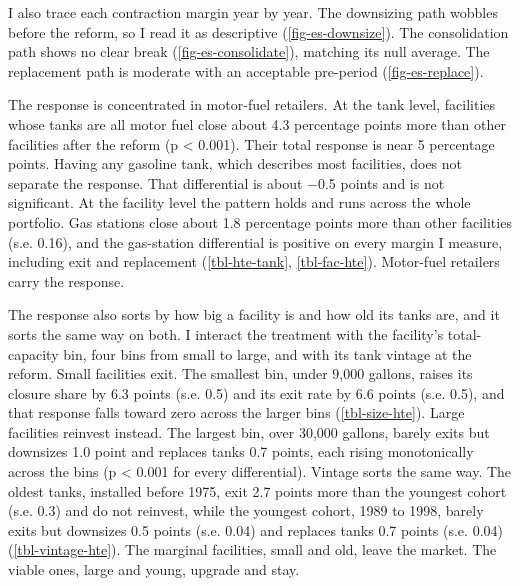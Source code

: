 \documentclass[
  12pt,
]{article}
\begin{document}
I also trace each contraction margin year by year. The downsizing path
wobbles before the reform, so I read it as descriptive
(\autoref{fig-es-downsize}). The consolidation path shows no clear break
(\autoref{fig-es-consolidate}), matching its null average. The
replacement path is moderate with an acceptable pre-period
(\autoref{fig-es-replace}).

The response is concentrated in motor-fuel retailers. At the tank level,
facilities whose tanks are all motor fuel close about 4.3 percentage
points more than other facilities after the reform (p \textless{}
0.001). Their total response is near 5 percentage points. Having any
gasoline tank, which describes most facilities, does not separate the
response. That differential is about −0.5 points and is not significant.
At the facility level the pattern holds and runs across the whole
portfolio. Gas stations close about 1.8 percentage points more than
other facilities (s.e. 0.16), and the gas-station differential is
positive on every margin I measure, including exit and replacement
(\autoref{tbl-hte-tank}, \autoref{tbl-fac-hte}). Motor-fuel retailers
carry the response.

The response also sorts by how big a facility is and how old its tanks
are, and it sorts the same way on both. I interact the treatment with
the facility's total-capacity bin, four bins from small to large, and
with its tank vintage at the reform. Small facilities exit. The smallest
bin, under 9,000 gallons, raises its closure share by 6.3 points (s.e.
0.5) and its exit rate by 6.6 points (s.e. 0.5), and that response falls
toward zero across the larger bins (\autoref{tbl-size-hte}). Large
facilities reinvest instead. The largest bin, over 30,000 gallons,
barely exits but downsizes 1.0 point and replaces tanks 0.7 points, each
rising monotonically across the bins (p \textless{} 0.001 for every
differential). Vintage sorts the same way. The oldest tanks, installed
before 1975, exit 2.7 points more than the youngest cohort (s.e. 0.3)
and do not reinvest, while the youngest cohort, 1989 to 1998, barely
exits but downsizes 0.5 points (s.e. 0.04) and replaces tanks 0.7 points
(s.e. 0.04) (\autoref{tbl-vintage-hte}). The marginal facilities, small
and old, leave the market. The viable ones, large and young, upgrade and
stay.
\end{document}
